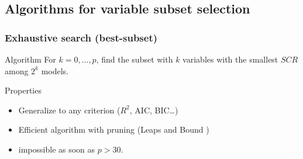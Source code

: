 \documentclass{beamer}\usepackage[]{graphicx}\usepackage[]{color}
\begin{document}
% 
% 
% 

\subsection{Algorithms for variable subset selection}

\begin{frame}
  \frametitle{Exhaustive search  (best-subset)}

  \begin{block}{Algorithm}
    For $k=0,\dots,p$,  find the subset with  $k$ variables with the smallest  $SCR$ among $2^k$ models.
  \end{block}
  
  \vfill
  
  \begin{block}{Properties}
    \begin{itemize}
    \item Generalize to any criterion ($R^2$, AIC, BIC\dots)
    \item Efficient algorithm with pruning  (\og Leaps and Bound \fg)
    \item impossible as soon as $p>30$.
    \end{itemize}
  \end{block}
\end{frame}
\end{document}
